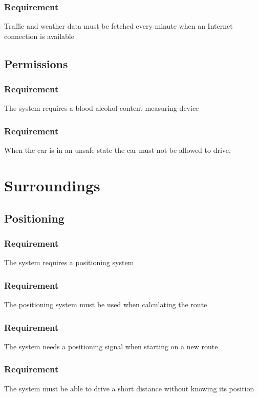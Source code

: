 \documentclass{article}
\begin{document}
{      \subsubsection{Requirement}
\hfill \break 
\- \- \-Traffic and weather data must be fetched every minute when an Internet connection is available
  \subsection{Permissions}
      \subsubsection{Requirement}
\hfill \break 
\- \- \-The system requires a blood alcohol content measuring device
      \subsubsection{Requirement}
\hfill \break 
\- \- \-When the car is in an unsafe state the car must not be allowed to drive.
      
\section{Surroundings}
  \subsection{Positioning}
      \subsubsection{Requirement}
\hfill \break 
\- \- \-The system requires a positioning system
      \subsubsection{Requirement}
\hfill \break 
\- \- \-The positioning system must be used when calculating the route
      \subsubsection{Requirement}
\hfill \break 
\- \- \-The system needs a positioning signal when starting on a new route
      \subsubsection{Requirement}
\hfill \break 
\- \- \-The system must be able to drive a short distance without knowing its position
}
\end{document}
